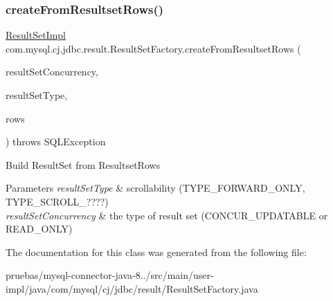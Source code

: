 \subsubsection{\texorpdfstring{create\+From\+Resultset\+Rows()}{createFromResultsetRows()}}
{\footnotesize\ttfamily \mbox{\hyperlink{classcom_1_1mysql_1_1cj_1_1jdbc_1_1result_1_1_result_set_impl}{Result\+Set\+Impl}} com.\+mysql.\+cj.\+jdbc.\+result.\+Result\+Set\+Factory.\+create\+From\+Resultset\+Rows (\begin{DoxyParamCaption}\item[{int}]{result\+Set\+Concurrency,  }\item[{int}]{result\+Set\+Type,  }\item[{\mbox{\hyperlink{interfacecom_1_1mysql_1_1cj_1_1protocol_1_1_resultset_rows}{Resultset\+Rows}}}]{rows }\end{DoxyParamCaption}) throws S\+Q\+L\+Exception}

Build Result\+Set from Resultset\+Rows


\begin{DoxyParams}{Parameters}
{\em result\+Set\+Type} & scrollability (T\+Y\+P\+E\+\_\+\+F\+O\+R\+W\+A\+R\+D\+\_\+\+O\+N\+LY, T\+Y\+P\+E\+\_\+\+S\+C\+R\+O\+L\+L\+\_\+????) \\
\hline
{\em result\+Set\+Concurrency} & the type of result set (C\+O\+N\+C\+U\+R\+\_\+\+U\+P\+D\+A\+T\+A\+B\+LE or R\+E\+A\+D\+\_\+\+O\+N\+LY) \\
\hline
\end{DoxyParams}


The documentation for this class was generated from the following file\+:\begin{DoxyCompactItemize}
\item 
pruebas/mysql-\/connector-\/java-\/8../src/main/user-\/impl/java/com/mysql/cj/jdbc/result/Result\+Set\+Factory.\+java\end{DoxyCompactItemize}
